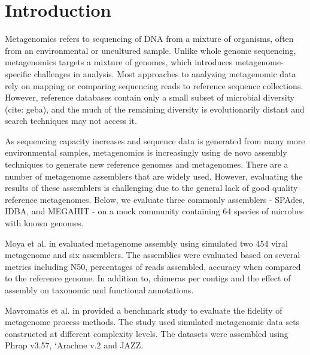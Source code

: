 \documentclass[10pt,a4paper,twocolumn]{article}
\begin{document}
\clearpage

\section*{Introduction}

Metagenomics refers to sequencing of DNA from a mixture of organisms,
often from an environmental or uncultured sample. Unlike whole genome
sequencing, metagenomics targets a mixture of genomes, which
introduces metagenome-specific challenges in analysis.  Most
approaches to analyzing metagenomic data rely on mapping or comparing
sequencing reads to reference sequence collections. However, reference
databases contain only a small subset of microbial diversity (cite:
geba), and the much of the remaining diversity is evolutionarily distant
and search techniques may not access it.

As sequencing capacity increases and sequence data is generated from
many more environmental samples, metagenomics is increasingly using de
novo assembly techniques to generate new reference genomes and
metagenomes.  There are a number of metagenome assemblers that are
widely used. However, evaluating the results of these assemblers is
challenging due to the general lack of good quality reference
metagenomes.  Below, we evaluate three commonly assemblers - SPAdes,
IDBA, and MEGAHIT - on a mock community containing 64 species of
microbes with known genomes.


 
 
Moya et al. in \cite{moya2014} evaluated metagenome assembly using
simulated two 454 viral metagenome and six assemblers. The assemblies
were evaluated based on several metrics including N50, percentages of
reads assembled, accuracy when compared to the reference genome. In
addition to, chimeras per contigs and the effect of assembly on
taxonomic and functional annotations.
 
Mavromatis et al. in \cite{mavromatis2007} provided a benchmark study
to evaluate the fidelity of metagenome process methods. The study used
simulated metagenomic data sets constructed at different complexity
levels.
The datasets were assembled using Phrap v3.57, `Arachne v.2
\cite{arachne} and JAZZ. \cite{jazz}
\end{document}
